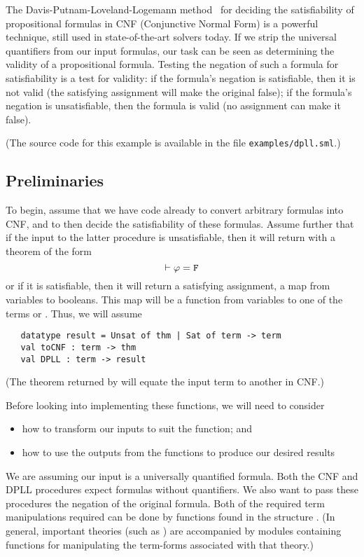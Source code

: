 The Davis-Putnam-Loveland-Logemann method~\cite{DPLL-paper} for
deciding the satisfiability of propositional formulas in CNF
(Conjunctive Normal Form) is a powerful technique, still used in
state-of-the-art solvers today.  If we strip the universal quantifiers
from our input formulas, our task can be seen as determining the
validity of a propositional formula.  Testing the negation of such a
formula for satisfiability is a test for validity: if the formula's
negation is satisfiable, then it is not valid (the satisfying
assignment will make the original false); if the formula's negation is
unsatisfiable, then the formula is valid (no assignment can make it
false).

\smallskip
\noindent
(The source code for this example is available in the file \texttt{examples/dpll.sml}.)

\subsection*{Preliminaries}

To begin, assume that we have code already to convert arbitrary
formulas into CNF{}, and to then decide the satisfiability of these
formulas.  Assume further that if the input to the latter procedure is
unsatisfiable, then it will return with a theorem of the form
\[ \vdash \varphi = \holtxt{F}
\]
or if it is satisfiable, then it will return a satisfying assignment,
a map from variables to booleans.   This map will be a function from
\HOL{} variables to one of the \HOL{} terms  or .
Thus, we will assume
\begin{hol}
\begin{verbatim}
   datatype result = Unsat of thm | Sat of term -> term
   val toCNF : term -> thm
   val DPLL : term -> result
\end{verbatim}
\end{hol}
(The theorem returned by  will equate the input term to
another in CNF{}.)

\smallskip
\noindent
Before looking into implementing these functions, we will need to
consider
\begin{itemize}
\item how to transform our inputs to suit the function; and
\item how to use the outputs from the functions to produce our desired
  results
\end{itemize}

We are assuming our input is a universally quantified formula.  Both
the CNF and DPLL procedures expect formulas without quantifiers.  We
also want to pass these procedures the negation of the original
formula.  Both of the required term manipulations required can be done
by functions found in the structure .  (In general,
important theories (such as ) are accompanied by
 modules containing functions for manipulating the
term-forms associated with that theory.)

